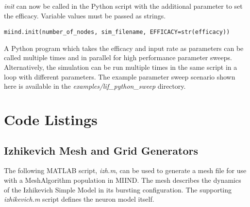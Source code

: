 \documentclass[utf8]{frontiers_suppmat} %
\begin{document}
\textit{init} can now be called in the Python script with the additional parameter to set the efficacy. Variable values must be passed as strings.

\begin{lstlisting}
miind.init(number_of_nodes, sim_filename, EFFICACY=str(efficacy))
\end{lstlisting}

A Python program which takes the efficacy and input rate as parameters can be called multiple times and in parallel for high performance parameter sweeps. Alternatively, the simulation can be run multiple times in the same script in a loop with different parameters. The example parameter sweep scenario shown here is available in the \textit{examples/lif\_python\_sweep} directory.

\section{Code Listings}

\subsection{Izhikevich Mesh and Grid Generators}
\label{izhmesh}
The following MATLAB script, \textit{izh.m}, can be used to generate a mesh file for use with a MeshAlgorithm population in MIIND. The mesh describes the dynamics of the Izhikevich Simple Model \citep{izhikevich2003simple} in its bursting configuration. The supporting \textit{izhikevich.m} script defines the neuron model itself. 
\end{document}
